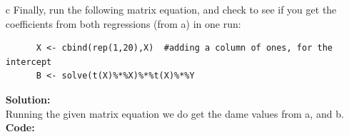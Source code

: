 \documentclass[12pt]{article}
\makeatletter
\theoremstyle{homework}
\newenvironment{exercise}[1]
{\def\@currentlabel{#1}\exercisecore}
{\endexercisecore}
\newcommand{\localhead}[1]{\par\smallskip\noindent\textbf{#1}\nobreak\\}%
\newcommand\solution{\localhead{Solution:}}
\makeatother
\begin{document}
\begin{exercise}{4}
\begin{enumerate}
  \item[c]  Finally, run the following matrix equation, 
  and check to see if you get the coefficients from both regressions (from a) in one run:
  \begin{footnotesize}
    \begin{verbatim}
      X <- cbind(rep(1,20),X)  #adding a column of ones, for the intercept
      B <- solve(t(X)%*%X)%*%t(X)%*%Y
    \end{verbatim}
  \end{footnotesize}
  \solution Running the given matrix equation we do get the dame values from a, and b.\\
  \textbf{Code:}
  \begin{center}
  
  \end{center}













\end{enumerate}








  
\end{exercise}
\end{document}
